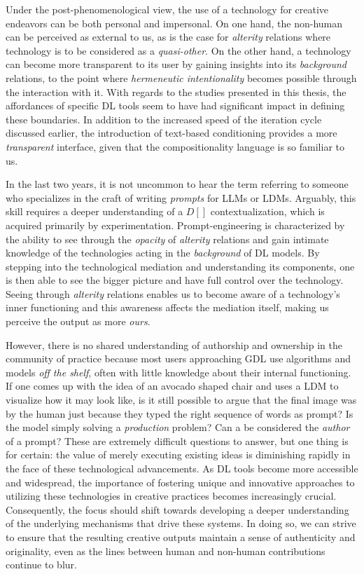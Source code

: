 Under the post-phenomenological view, the use of a technology for creative endeavors can be both personal and impersonal. On one hand, the non-human can be perceived as external to us, as is the case for \emph{alterity} relations where technology is to be considered as a \emph{quasi-other}. On the other hand, a technology can become more transparent to its user by gaining insights into its \emph{background} relations, to the point where \emph{hermeneutic intentionality} becomes possible through the interaction with it. With regards to the studies presented in this thesis, the affordances of specific DL tools seem to have had significant impact in defining these boundaries. In addition to the increased speed of the iteration cycle discussed earlier, the introduction of text-based conditioning provides a more \emph{transparent} interface, given that the compositionality language is so familiar to us.

In the last two years, it is not uncommon to hear the term  referring to someone who specializes in the craft of writing \emph{prompts} for LLMs or LDMs. Arguably, this skill requires a deeper understanding of a $D[]$ contextualization, which is acquired primarily by experimentation. Prompt-engineering is characterized by the ability to see through the \emph{opacity} of \emph{alterity} relations and gain intimate knowledge of the technologies acting in the \emph{background} of DL models. By stepping into the technological mediation and understanding its components, one is then able to see the bigger picture and have full control over the technology. Seeing through \emph{alterity} relations enables us to become aware of a technology's inner functioning and this awareness affects the mediation itself, making us perceive the output as more \emph{ours}.

However, there is no shared understanding of authorship and ownership in the community of practice because most users approaching GDL use algorithms and models \emph{off the shelf}, often with little knowledge about their internal functioning. If one comes up with the idea of an avocado shaped chair and uses a LDM to visualize how it may look like, is it still possible to argue that the final image was  by the human just because they typed the right sequence of words as prompt? Is the model simply solving a \emph{production} problem? Can a  be considered the \emph{author} of a prompt? These are extremely difficult questions to answer, but one thing is for certain: the value of merely executing existing ideas is diminishing rapidly in the face of these technological advancements. As DL tools become more accessible and widespread, the importance of fostering unique and innovative approaches to utilizing these technologies in creative practices becomes increasingly crucial. Consequently, the focus should shift towards developing a deeper understanding of the underlying mechanisms that drive these systems. In doing so, we can strive to ensure that the resulting creative outputs maintain a sense of authenticity and originality, even as the lines between human and non-human contributions continue to blur.





